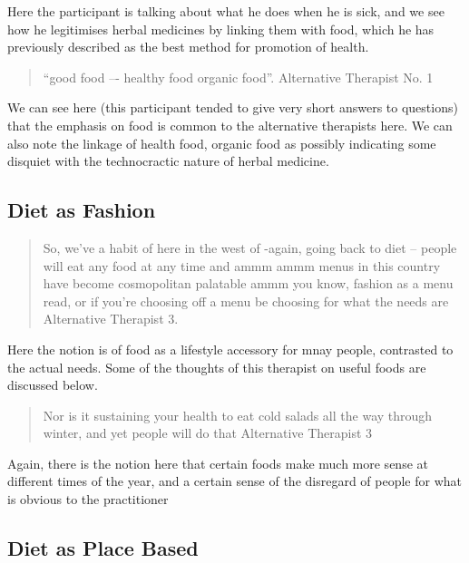 Here the participant is talking about what he does when he is sick, and we see how he legitimises herbal medicines by linking them with food, which he has previously described as the best method for promotion of health. 
\begin{quotation}
``good food –- healthy food organic food''. Alternative Therapist No. 1  
\end{quotation}

We can see here (this participant tended to give very short answers to questions) that the emphasis on food is common to the alternative therapists here. We can also note the linkage of health food, organic food as possibly indicating some disquiet with the technocractic nature of herbal medicine. 

\subsection{Diet as Fashion}
\label{sec:diet-as-fashion}

\begin{quotation}
  So, we've a habit of here in the west of -again, going back to diet – people will eat any food at any time and ammm ammm menus in this country have become cosmopolitan palatable ammm you know, fashion as a menu read, or if you're choosing off  a menu be choosing for what the needs are
Alternative Therapist 3. 
\end{quotation}

Here the notion is of food as a lifestyle accessory for mnay people, contrasted to the actual needs. Some of the thoughts of this therapist on useful foods are discussed below. 

\begin{quotation}
  Nor is it sustaining your health to eat cold salads all the way through winter, and yet people will do that
Alternative Therapist 3
\end{quotation}

Again, there is the notion here that certain foods make much more sense at different times of the year, and a certain sense of the disregard of people for what is obvious to the practitioner 



\subsection{Diet as Place Based}
\label{sec:diet-as-place}

